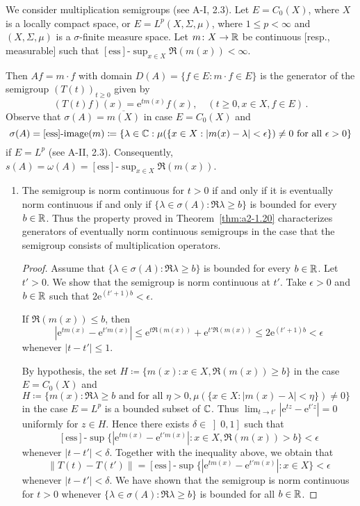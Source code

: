 \begin{example}\label{ex:a2-1.28}
We consider multiplication semigroups (see A-I, 2.3).
Let $E = C_{0}(X)$, where $X$ is a locally compact space, or $E = L^{p}(X,\Sigma,\mu)$, where $1 \leq p < \infty$ and $(X,\Sigma,\mu)$ is a $\sigma$-finite measure space.
Let $m \colon X \to \mathbb{R}$ be continuous [resp., measurable] such that $[\text{ess}]\text{-}\sup_{x \in X} \Re(m(x)) < \infty$.

Then $Af = m \cdot f$ with domain $D(A) = \{f \in E : m \cdot f \in E\}$ is the generator of the semigroup $(T(t))_{t \geq 0}$ given by
\[
    (T(t)f)(x) = \mathrm{e}^{tm(x)}f(x), \quad (t \geq 0, x \in X, f \in E )\, .
\]
Observe that $\sigma(A) = \overline{m(X)}$ in case $E = C_{0}(X)$ 
and 
\[
\sigma(A) = [\text{ess}]\text{-}\text{image}(m) \coloneqq \{\lambda \in \mathbb{C} : \mu(\{x \in X : |m(x)-\lambda| < \epsilon\}) \neq 0 \text{ for all } \epsilon > 0\}
\]
if $E = L^{p}$ (see A-II, 2.3).
Consequently, $s(A) = \omega(A) = [\text{ess}]\text{-}\sup_{x \in X} \Re(m(x))$.

\begin{enumerate}[\upshape (i), wide, labelindent=.5em]
\item \label{ex:a2-1.28-1}
The semigroup is norm continuous for $t > 0$ if and only if it is eventually norm continuous if and only if 
$\{\lambda \in \sigma(A) : \Re\lambda \geq b\}$ 
is bounded for every $b \in \mathbb{R}$.
Thus the property proved in Theorem~\ref{thm:a2-1.20}   characterizes generators of eventually norm continuous semigroups in the case that the semigroup consists of multiplication operators.
\begin{proof}
Assume that $\{\lambda \in \sigma(A) : \Re\lambda \geq b\}$ is bounded for every $b \in \mathbb{R}$.
Let $t' > 0$.
We show that the semigroup is norm continuous at $t'$.
Take $\epsilon > 0$ and $b \in \mathbb{R}$ such that $2\mathrm{e}^{(t'+1)b} < \epsilon$.

If $\Re(m(x)) \leq b$, then
\[
    |\mathrm{e}^{tm(x)} - \mathrm{e}^{t'm(x)}| \leq \mathrm{e}^{t\Re(m(x))} + \mathrm{e}^{t'\Re(m(x))} \leq 2\mathrm{e}^{(t'+1)b} < \epsilon
\]
whenever $|t-t'| \leq 1$.

By hypothesis, the set 
$H \coloneqq \{m(x) : x \in X, \Re(m(x)) \geq b\}$ 
in the case $E = C_{0}(X)$ 
and $H \coloneqq \{m(x) : \Re\lambda \geq b \text{ and for all } \eta > 0, 
\mu(\{x \in X : |m(x)-\lambda| < \eta \}) \neq 0\}$
in the case $E = L^{p}$ 
is a bounded subset of $\mathbb{C}$.
Thus $\lim_{t \to t'} |\mathrm{e}^{tz} - \mathrm{e}^{t'z}| = 0$ 
uniformly for $z \in H$.
Hence there exists $\delta \in \left]0,1\right]$ such that
\[
[\text{ess}]\text{-}\sup\{|\mathrm{e}^{tm(x)} - \mathrm{e}^{t'm(x)}| : x \in X, \Re(m(x)) > b\} < \epsilon
\] 
whenever $|t-t'| < \delta$.
Together with the inequality above, we obtain that 
\[
\|T(t) - T(t')\| = [\text{ess}]\text{-}\sup\{|\mathrm{e}^{tm(x)} - \mathrm{e}^{t'm(x)}| : x \in X\} < \epsilon
\]
whenever $|t-t'| < \delta$.
We have shown that the semigroup is norm continuous for $t > 0$ whenever $\{\lambda \in \sigma(A) : \Re\lambda \geq b\}$ is bounded for all $b \in \mathbb{R}$.
\end{proof}


\end{enumerate}
\end{example}
